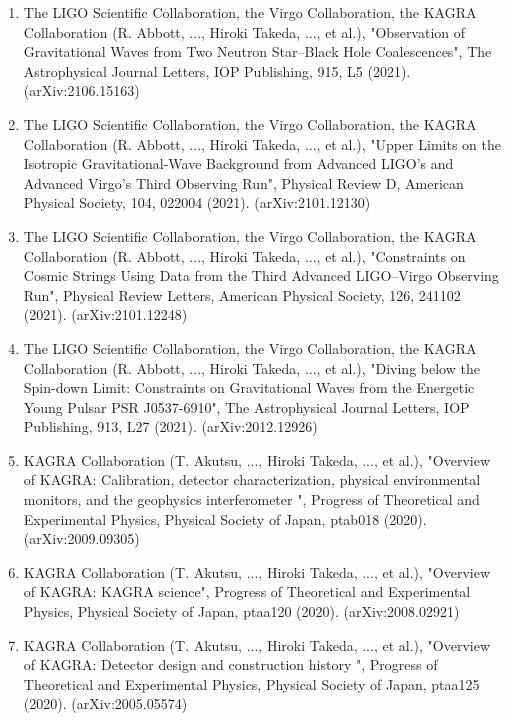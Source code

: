 \documentclass[uplatex, 12pt,a4paper]{jsarticle}
\begin{document}
\begin{enumerate}
\item The LIGO Scientific Collaboration, the Virgo Collaboration, the KAGRA Collaboration (R. Abbott, ..., Hiroki Takeda, ..., et al.), "Observation of Gravitational Waves from Two Neutron Star–Black Hole Coalescences", The Astrophysical Journal Letters, IOP Publishing, 915, L5 (2021). (arXiv:2106.15163)

\item The LIGO Scientific Collaboration, the Virgo Collaboration, the KAGRA Collaboration (R. Abbott, ..., Hiroki Takeda, ..., et al.), "Upper Limits on the Isotropic Gravitational-Wave Background from Advanced LIGO's and Advanced Virgo's Third Observing Run", Physical Review D, American Physical Society, 104, 022004 (2021). (arXiv:2101.12130)

\item The LIGO Scientific Collaboration, the Virgo Collaboration, the KAGRA Collaboration (R. Abbott, ..., Hiroki Takeda, ..., et al.), "Constraints on Cosmic Strings Using Data from the Third Advanced LIGO–Virgo Observing Run", Physical Review Letters, American Physical Society, 126, 241102 (2021). (arXiv:2101.12248)

\item The LIGO Scientific Collaboration, the Virgo Collaboration, the KAGRA Collaboration (R. Abbott, ..., Hiroki Takeda, ..., et al.), "Diving below the Spin-down Limit: Constraints on Gravitational Waves from the Energetic Young Pulsar PSR J0537-6910", The Astrophysical Journal Letters, IOP Publishing, 913, L27 (2021). (arXiv:2012.12926)

\item KAGRA Collaboration (T. Akutsu, ..., Hiroki Takeda, ..., et al.), "Overview of KAGRA: Calibration, detector characterization, physical environmental monitors, and the geophysics interferometer ", Progress of Theoretical and Experimental Physics, Physical Society of Japan, ptab018 (2020). (arXiv:2009.09305)

\item KAGRA Collaboration (T. Akutsu, ..., Hiroki Takeda, ..., et al.), "Overview of KAGRA: KAGRA science", Progress of Theoretical and Experimental Physics, Physical Society of Japan, ptaa120 (2020). (arXiv:2008.02921)

\item KAGRA Collaboration (T. Akutsu, ..., Hiroki Takeda, ..., et al.), "Overview of KAGRA: Detector design and construction history ", Progress of Theoretical and Experimental Physics, Physical Society of Japan, ptaa125 (2020). (arXiv:2005.05574)


\end{enumerate}
\end{document}
